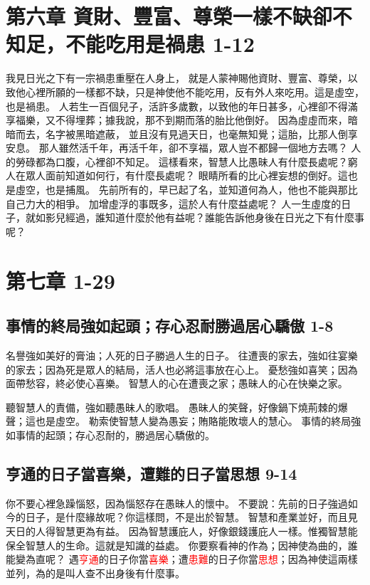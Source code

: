 \section{第六章 資財、豐富、尊榮一樣不缺卻不知足，不能吃用是禍患 1-12}
我見日光之下有一宗禍患重壓在人身上，
就是人蒙神賜他資財、豐富、尊榮，以致他心裡所願的一樣都不缺，只是神使他不能吃用，反有外人來吃用。這是虛空，也是禍患。
人若生一百個兒子，活許多歲數，以致他的年日甚多，心裡卻不得滿享福樂，又不得埋葬；據我說，那不到期而落的胎比他倒好。
因為虛虛而來，暗暗而去，名字被黑暗遮蔽，
並且沒有見過天日，也毫無知覺；這胎，比那人倒享安息。
那人雖然活千年，再活千年，卻不享福，眾人豈不都歸一個地方去嗎？
人的勞碌都為口腹，心裡卻不知足。
這樣看來，智慧人比愚昧人有什麼長處呢？窮人在眾人面前知道如何行，有什麼長處呢？
眼睛所看的比心裡妄想的倒好。這也是虛空，也是捕風。
先前所有的，早已起了名，並知道何為人，他也不能與那比自己力大的相爭。
加增虛浮的事既多，這於人有什麼益處呢？
人一生虛度的日子，就如影兒經過，誰知道什麼於他有益呢？誰能告訴他身後在日光之下有什麼事呢？


\section{第七章  1-29}
\subsection{事情的終局強如起頭；存心忍耐勝過居心驕傲  1-8}
名譽強如美好的膏油；人死的日子勝過人生的日子。
往遭喪的家去，強如往宴樂的家去；因為死是眾人的結局，活人也必將這事放在心上。
憂愁強如喜笑；因為面帶愁容，終必使心喜樂。
智慧人的心在遭喪之家；愚昧人的心在快樂之家。

聽智慧人的責備，強如聽愚昧人的歌唱。
愚昧人的笑聲，好像鍋下燒荊棘的爆聲；這也是虛空。
勒索使智慧人變為愚妄；賄賂能敗壞人的慧心。
事情的終局強如事情的起頭；存心忍耐的，勝過居心驕傲的。

\subsection{亨通的日子當喜樂，遭難的日子當思想 9-14}
你不要心裡急躁惱怒，因為惱怒存在愚昧人的懷中。
不要說：先前的日子強過如今的日子，是什麼緣故呢？你這樣問，不是出於智慧。
智慧和產業並好，而且見天日的人得智慧更為有益。
因為智慧護庇人，好像銀錢護庇人一樣。惟獨智慧能保全智慧人的生命。這就是知識的益處。
你要察看神的作為；因神使為曲的，誰能變為直呢？
遇\textcolor{red}{亨通}的日子你當\textcolor{red}{喜樂}；遭\textcolor{red}{患難}的日子你當\textcolor{red}{思想}；因為神使這兩樣並列，為的是叫人查不出身後有什麼事。

